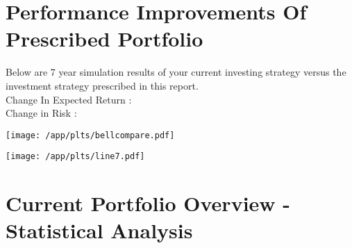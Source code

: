 \documentclass{article}
\begin{document}



\newpage    %

\section{Performance Improvements Of Prescribed Portfolio}

Below are 7 year simulation results of your current investing strategy versus the investment strategy prescribed in this report. \\
Change In Expected Return : {}\\
Change in Risk : {}

\vspace{.4cm}
\begin{center}


\texttt{[image: /app/plts/bellcompare.pdf]}\par

\vspace{.5cm}

\hspace*{-1cm}\texttt{[image: /app/plts/line7.pdf]}\par
\end{center}

\newpage    %

\section{Current Portfolio Overview - Statistical Analysis}

\vspace{1.5cm}

\end{document}
